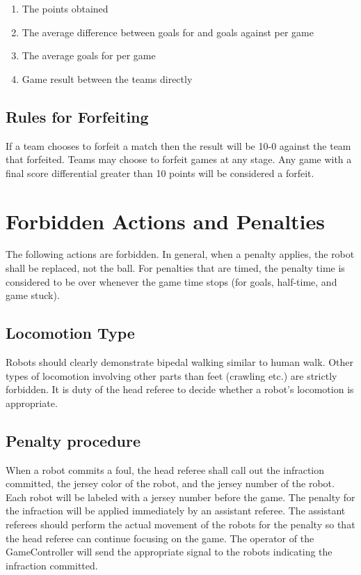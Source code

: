 \documentclass[12pt]{article}
\begin{document}
\begin{enumerate}
\item The points obtained
\item The average difference between goals for and goals against per game
\item The average goals for per game
\item Game result between the teams directly
\end{enumerate}


\subsection{Rules for Forfeiting}

If a team chooses to forfeit a match then the result will be 10-0 against the
team that forfeited. Teams may choose to forfeit games at any stage. Any game
with a final score differential greater than 10 points will be considered a forfeit.

\section{Forbidden Actions and Penalties}
\label{sec:forbidden_act}

The following actions are forbidden. In general, when a penalty
applies, the robot shall be replaced, not the ball.  For penalties
that are timed, the penalty time is considered to be over whenever
the game time stops (for goals, half-time, and game stuck).

\subsection{Locomotion Type}
\label{sec:locomotion_type}
Robots should clearly demonstrate bipedal walking similar to human walk. Other types of locomotion involving other parts than feet (crawling etc.) are strictly forbidden. It is duty of the head referee to decide whether a robot's locomotion is appropriate.

\subsection{Penalty procedure}
\label{sec:penalty_procedure}

When a robot commits a foul, the head referee shall call out the
infraction committed, the jersey color of the robot, and the jersey
number of the robot.  Each robot will be labeled with a jersey
number before the game.  The penalty for the infraction will be
applied immediately by an assistant referee.  The assistant referees
should perform the actual movement of the robots for the penalty so
that the head referee can continue focusing on the game.  The
operator of the GameController will send the appropriate signal to
the robots indicating the infraction committed.
\end{document}
